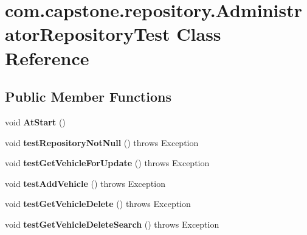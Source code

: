 \hypertarget{classcom_1_1capstone_1_1repository_1_1_administrator_repository_test}{}\section{com.\+capstone.\+repository.\+Administrator\+Repository\+Test Class Reference}
\label{classcom_1_1capstone_1_1repository_1_1_administrator_repository_test}
\subsection*{Public Member Functions}
\begin{DoxyCompactItemize}
\item 
\mbox{\label{classcom_1_1capstone_1_1repository_1_1_administrator_repository_test_aefe19bb552f95410c41be07b8dea9e1f}} 
void {\bfseries At\+Start} ()
\item 
\mbox{\label{classcom_1_1capstone_1_1repository_1_1_administrator_repository_test_a5ae418bbeb7449203e534e4e794bc513}} 
void {\bfseries test\+Repository\+Not\+Null} ()  throws Exception 
\item 
\mbox{\label{classcom_1_1capstone_1_1repository_1_1_administrator_repository_test_a336a2aa61f75b727093f974a8a90b7e7}} 
void {\bfseries test\+Get\+Vehicle\+For\+Update} ()  throws Exception 
\item 
\mbox{\label{classcom_1_1capstone_1_1repository_1_1_administrator_repository_test_a49beb623962d96a637a8bf08c4b9ec79}} 
void {\bfseries test\+Add\+Vehicle} ()  throws Exception 
\item 
\mbox{\label{classcom_1_1capstone_1_1repository_1_1_administrator_repository_test_a8bef89b5103405367c0a17f8bc3c7cd4}} 
void {\bfseries test\+Get\+Vehicle\+Delete} ()  throws Exception 
\item 
\mbox{\label{classcom_1_1capstone_1_1repository_1_1_administrator_repository_test_aaa375b6794263f730750d4c9e929bcc1}} 
void {\bfseries test\+Get\+Vehicle\+Delete\+Search} ()  throws Exception 
\end{DoxyCompactItemize}
